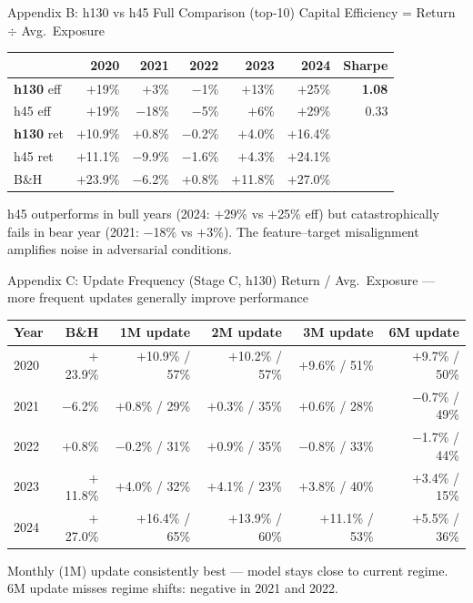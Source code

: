 \documentclass[aspectratio=169]{beamer}
\begin{document}
\begin{frame}{Appendix B: h130 vs h45 Full Comparison (top-10)}
  \small
  Capital Efficiency = Return $\div$ Avg.\ Exposure

  \vspace{0.3em}
  \begin{tabular}{lrrrrrr}
    \toprule
    & 2020 & 2021 & 2022 & 2023 & 2024 & Sharpe \\
    \midrule
    \textbf{h130} eff & $+$19\% & $+$3\% & $-$1\% & $+$13\% & $+$25\% & \textbf{1.08} \\
    h45 eff  & $+$19\% & \textcolor{qRed}{$-$18\%} & $-$5\% & $+$6\% & $+$29\% & \textcolor{qRed}{0.33} \\
    \midrule
    \textbf{h130} ret & $+$10.9\% & $+$0.8\% & $-$0.2\% & $+$4.0\% & $+$16.4\% & \\
    h45 ret  & $+$11.1\% & \textcolor{qRed}{$-$9.9\%} & $-$1.6\% & $+$4.3\% & $+$24.1\% & \\
    \midrule
    B\&H & $+$23.9\% & $-$6.2\% & $+$0.8\% & $+$11.8\% & $+$27.0\% & \\
    \bottomrule
  \end{tabular}

  \vspace{0.4em}
  h45 outperforms in bull years (2024: $+$29\% vs $+$25\% eff) but
  catastrophically fails in bear year (2021: $-$18\% vs $+$3\%).
  The feature--target misalignment amplifies noise in adversarial conditions.
\end{frame}

\begin{frame}{Appendix C: Update Frequency (Stage C, h130)}
  \small
  Return / Avg.\ Exposure --- more frequent updates generally improve performance

  \vspace{0.3em}
  \begin{tabular}{lrrrrr}
    \toprule
    Year & B\&H & 1M update & 2M update & 3M update & 6M update \\
    \midrule
    2020 & $+$23.9\% & $+$10.9\% / 57\% & $+$10.2\% / 57\% & $+$9.6\% / 51\% & $+$9.7\% / 50\% \\
    2021 & $-$6.2\%  & $+$0.8\% / 29\%  & $+$0.3\% / 35\%  & $+$0.6\% / 28\% & $-$0.7\% / 49\% \\
    2022 & $+$0.8\%  & $-$0.2\% / 31\%  & $+$0.9\% / 35\%  & $-$0.8\% / 33\% & $-$1.7\% / 44\% \\
    2023 & $+$11.8\% & $+$4.0\% / 32\%  & $+$4.1\% / 23\%  & $+$3.8\% / 40\% & $+$3.4\% / 15\% \\
    2024 & $+$27.0\% & $+$16.4\% / 65\% & $+$13.9\% / 60\% & $+$11.1\% / 53\% & $+$5.5\% / 36\% \\
    \bottomrule
  \end{tabular}

  \vspace{0.3em}
  Monthly (1M) update consistently best --- model stays close to current regime.
  6M update misses regime shifts: negative in 2021 and 2022.
\end{frame}
\end{document}

